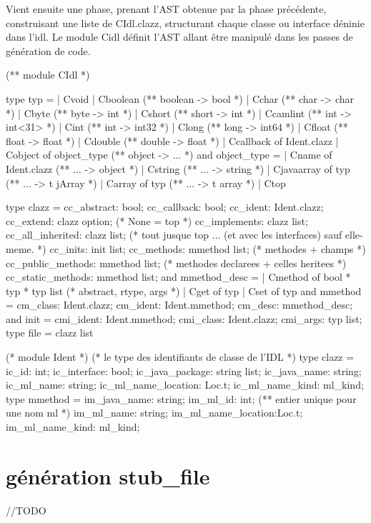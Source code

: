 \documentclass[a4paper, 11pt]{report}
\begin{document}
Vient ensuite une phase, prenant l'AST obtenue par la
phase précédente, construisant une liste de CIdl.clazz, structurant
chaque classe ou interface déninie dans l'idl. 
Le module Cidl définit l'AST allant être manipulé dans les passes de
génération de code.
\begin{OCaml}
(**  module CIdl  *)

type typ =
  | Cvoid
  | Cboolean (** boolean -> bool *)
  | Cchar (** char -> char *)
  | Cbyte (** byte -> int *)
  | Cshort (** short -> int *)
  | Ccamlint (** int -> int<31> *)
  | Cint (** int -> int32 *)
  | Clong (** long -> int64 *)
  | Cfloat (** float -> float *)
  | Cdouble (** double -> float *)
  | Ccallback of Ident.clazz
  | Cobject of object_type (** object -> ... *)
and object_type = 
  | Cname of Ident.clazz (** ... -> object *)
  | Cstring (** ... -> string *)
  | Cjavaarray of typ (** ... -> t jArray *) 
  | Carray of typ (** ... -> t array *) 
  | Ctop

type clazz = {
    cc_abstract: bool;
    cc_callback: bool;
    cc_ident: Ident.clazz;
    cc_extend: clazz option; (* None = top *)
    cc_implements: clazz list;
    cc_all_inherited: clazz list; (* tout jusque top ... (et avec les interfaces) sauf elle-meme. *)
    cc_inits: init list;
    cc_methods: mmethod list; (* methodes + champs *)
    cc_public_methods: mmethod list; (* methodes declarees + celles heritees *)
    cc_static_methods: mmethod list; 
  }
and mmethod_desc = 
  | Cmethod of bool * typ * typ list (* abstract, rtype, args *)
  | Cget of typ
  | Cset of typ
and mmethod = {
    cm_class: Ident.clazz;
    cm_ident: Ident.mmethod; 
    cm_desc: mmethod_desc;
  }         
and init = {
    cmi_ident: Ident.mmethod;
    cmi_class: Ident.clazz;
    cmi_args: typ list;
  }
type file = clazz list
\end{OCaml}
\begin{OCaml}
(* module Ident  *)
(* le type des identifiants de classe de l'IDL *)
type clazz = {
    ic_id: int;
    ic_interface: bool;
    ic_java_package: string list;
    ic_java_name: string;
    ic_ml_name: string;
    ic_ml_name_location: Loc.t;
    ic_ml_name_kind: ml_kind;
  }
type mmethod = {
    im_java_name: string;
    im_ml_id: int; (** entier unique pour une nom ml *)
    im_ml_name: string;
    im_ml_name_location:Loc.t;
    im_ml_name_kind: ml_kind;
  }
\end{OCaml}
\section{génération stub\_file}
//TODO
\end{document}
